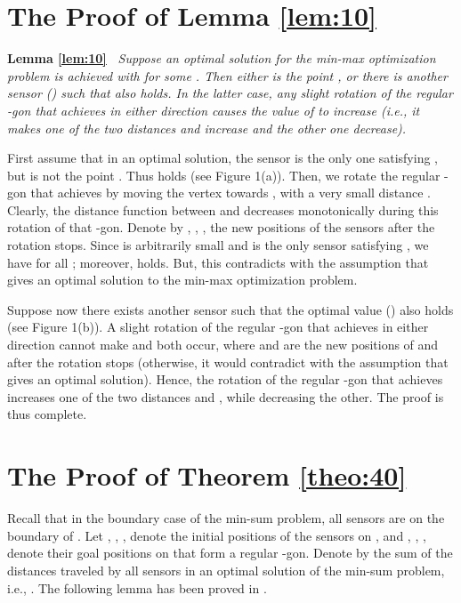 \documentclass[11pt]{article}
\newenvironment{proof}{\noindent {\textbf{Proof:}}\rm}{\hfill 
\rm}
\begin{document}
\section{The Proof of Lemma \ref{lem:10}}
\label{app:lemmaproofs}

\noindent
{\bf Lemma \ref{lem:10}\ }\cite{ref:TanNe10}
{\em
Suppose an optimal solution for the min-max optimization problem is achieved
with  for some . Then either  is the point , or there is
another sensor  () such that  also holds. In the latter case, any slight rotation of the
regular -gon that achieves  in either direction
causes the value of  to increase (i.e., it makes one of the two
distances  and  increase and the other one decrease).
}
\vspace{0.15in}

\begin{proof}
First assume that in an optimal solution,
the sensor  is the only one satisfying ,
but  is not the point . Thus  holds (see Figure 1(a)).
Then, we rotate the regular -gon that achieves  by moving
the vertex  towards , with a very small distance . Clearly,
the distance function between  and  decreases monotonically during
this rotation of that -gon. Denote by , , , 
the new positions of the sensors after the rotation stops. Since  is
arbitrarily small and  is the only sensor satisfying ,
we have  for all ;
moreover,  holds. But, this contradicts with
the assumption that
 gives an optimal solution to the min-max optimization problem.

Suppose now there exists another sensor  such that the optimal value
 () also holds (see Figure 1(b)).
A slight rotation of the regular -gon that achieves 
in either direction cannot make 
and  both occur, where  and 
are the new positions of  and  after the rotation stops
(otherwise, it would contradict with the assumption that  gives an optimal solution).
Hence, the rotation of the regular -gon that achieves 
increases one of the two distances
 and , while decreasing the other.
The proof is thus complete.
\end{proof}

\section{The Proof of Theorem \ref{theo:40}}
\label{app:Theorem40}

Recall that in the boundary case of the min-sum problem, all sensors
are on the boundary  of . Let , , , 
denote the initial positions of the  sensors on , and
, , ,  denote their goal positions on
 that form a regular -gon. Denote by  the
sum of the distances traveled by all  sensors in an optimal solution
of the min-sum problem, i.e., . The following lemma has been proved in
\cite{ref:TanNe10}.
\end{document}
